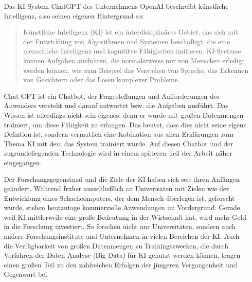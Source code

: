\documentclass[a4paper,12pt, german]{report}
\begin{document}
Das KI-System ChatGPT des Unternehmens OpenAI beschreibt künstliche Intelligenz, also seinen eigenen Hintergrund so:
\begin{quote}
  Künstliche Intelligenz (KI) ist ein interdisziplinäres Gebiet, das sich mit der Entwicklung von Algorithmen und Systemen beschäftigt, die eine menschliche Intelligenz und kognititve Fähigkeiten imitieren. KI-Systeme können Aufgaben ausführen, die normalerweise nur von Menschen erledigt werden können, wie zum Beispiel das Verstehen von Sprache, das Erkennen von Gesichtern oder das Lösen komplexer Probleme.
\end{quote}

Chat GPT ist ein Chatbot, der Fragestellungen und Aufforderungen des Anwenders versteht und darauf antwortet bzw. die Aufgaben ausführt. Das Wissen ist allerdings nicht sein eigenes, denn er wurde mit großen Datenmengen trainiert, um diese Fähigkeit zu erlangen. Das beutet, dass dies nicht seine eigene Defintion ist, sondern vermutlich eine Kobination aus allen Erklärungen zum Thema KI mit dem das System trainiert wurde. Auf diesen Chatbot und der zugrundeliegenden Technologie wird in einem späteren Teil der Arbeit näher eingegangen.

Der Forschungsgegenstand und die Ziele der KI haben sich seit ihren Anfängen geändert. Während früher ausschließlich an Univerisäten mit Zielen wie der Entwicklung eines Schachcomputers, der dem Mensch überlegen ist, geforscht wurde, stehen heutzutage kommerzielle Anwendungen im Vordergrund. 
Gerade weil KI mittlerweile eine große Bedeutung in der Wirtschaft hat, wird mehr Geld in die Forschung investiert. So forschen nicht nur Universitäten, sondern auch andere Forschungsinstitute und Unternehmen in vielen Bereichen der KI. Auch die Verfügbarkeit von großen Datenmengen zu Trainingszwecken, die durch Verfahren der Daten-Analyse (Big-Data) für KI genutzt werden können, tragen einen großen Teil zu den zahlreichen Erfolgen der jüngeren Vergangenheit und Gegenwart bei. 
\end{document}

